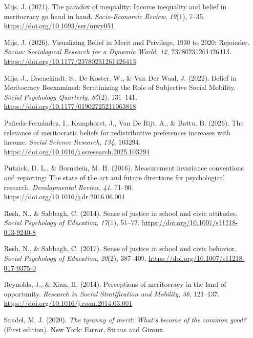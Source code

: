 \documentclass[
  13pt,
]{article}
\newlength{\cslhangindent}
\newenvironment{CSLReferences}[2] %
 {\begin{list}{}{%
  \setlength{\itemindent}{0pt}
  \setlength{\leftmargin}{0pt}
  \setlength{\parsep}{0pt}
  \ifodd #1
   \setlength{\leftmargin}{\cslhangindent}
   \setlength{\itemindent}{-1\cslhangindent}
  \fi
  \setlength{\itemsep}{#2\baselineskip}}}
 {\end{list}}
\begin{document}
\begin{CSLReferences}{1}{0}
Mijs, J. (2021). The paradox of inequality: Income inequality and belief
in meritocracy go hand in hand. \emph{Socio-Economic Review},
\emph{19}(1), 7--35. \url{https://doi.org/10.1093/ser/mwy051}

Mijs, J. (2026). Visualizing {Belief} in {Merit} and {Privilege}, 1930
to 2020: {Rejoinder}. \emph{Socius: Sociological Research for a Dynamic
World}, \emph{12}, 23780231261426413.
\url{https://doi.org/10.1177/23780231261426413}

Mijs, J., Daenekindt, S., De Koster, W., \& Van Der Waal, J. (2022).
Belief in {Meritocracy Reexamined}: {Scrutinizing} the {Role} of
{Subjective Social Mobility}. \emph{Social Psychology Quarterly},
\emph{85}(2), 131--141. \url{https://doi.org/10.1177/01902725211063818}

Pañeda-Fernández, I., Kamphorst, J., Van De Rijt, A., \& Battu, B.
(2026). The relevance of meritocratic beliefs for redistributive
preferences increases with income. \emph{Social Science Research},
\emph{134}, 103294.
\url{https://doi.org/10.1016/j.ssresearch.2025.103294}

Putnick, D. L., \& Bornstein, M. H. (2016). Measurement invariance
conventions and reporting: {The} state of the art and future directions
for psychological research. \emph{Developmental Review}, \emph{41},
71--90. \url{https://doi.org/10.1016/j.dr.2016.06.004}

Resh, N., \& Sabbagh, C. (2014). Sense of justice in school and civic
attitudes. \emph{Social Psychology of Education}, \emph{17}(1), 51--72.
\url{https://doi.org/10.1007/s11218-013-9240-8}

Resh, N., \& Sabbagh, C. (2017). Sense of justice in school and civic
behavior. \emph{Social Psychology of Education}, \emph{20}(2), 387--409.
\url{https://doi.org/10.1007/s11218-017-9375-0}

Reynolds, J., \& Xian, H. (2014). Perceptions of meritocracy in the land
of opportunity. \emph{Research in Social Stratification and Mobility},
\emph{36}, 121--137. \url{https://doi.org/10.1016/j.rssm.2014.03.001}

Sandel, M. J. (2020). \emph{The tyranny of merit: {What}'s become of the
common good?} (First edition). New York: {Farrar, Straus and Giroux}.


\end{CSLReferences}
\end{document}
